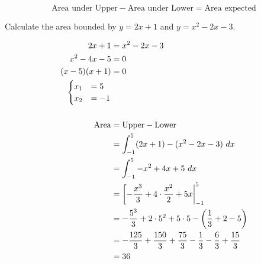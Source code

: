 $$
\text{Area under Upper} - \text{Area under Lower} = \text{Area expected}
$$

\begin{exercise}\nonumber
    Calculate the area bounded by $ y = 2x + 1 $ and $ y = x^2 - 2x - 3 $. \\

    \begin{figure}[H]
        \centering
    \end{figure}

    \begin{align}
        2x + 1         & = x^2 - 2x - 3                                                                             \\
        x^2 - 4x - 5   & = 0                                                                                        \\
        (x - 5)(x + 1) & = 0                                                                                        \\
        \begin{cases}
            x_1 & = 5  \\
            x_2 & = -1 \\
        \end{cases}
        \\
        \\
        \text{Area}    & = \text{Upper} - \text{Lower}                                                              \\
                       & = \int_{-1}^5 (2x + 1) - (x^2 - 2x - 3) \ dx                                               \\
                       & = \int_{-1}^5 -x^2 + 4x + 5 \ dx                                                           \\
                       & = \left[ -{x^3 \over 3} + 4 \cdot {x^2 \over 2} + 5x \right|_{-1}^5                        \\
                       & = -{5^3 \over 3} + 2 \cdot 5^2 + 5 \cdot 5 - \left({1 \over 3} + 2 - 5\right)              \\
                       & = -{125 \over 3} + {150 \over 3} + {75 \over 3} - {1 \over 3} - {6 \over 3} + {15 \over 3} \\
                       & = 36
    \end{align}
\end{exercise}

